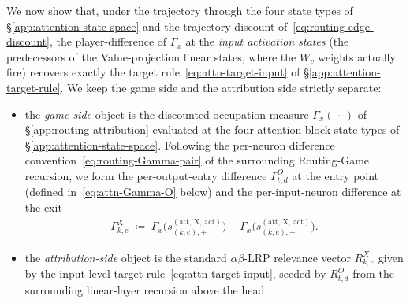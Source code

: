 \documentclass[twoside]{article}
\newcommand{\1}{\mathbf{1}}
\begin{document}
We now show that, under the trajectory through the four state types of
\S\ref{app:attention-state-space} and the trajectory discount of~\eqref{eq:routing-edge-discount},
the player-difference of $\Gamma_x$ at the \emph{input activation states} (the predecessors of the
Value-projection linear states, where the $W_v$ weights actually fire) recovers exactly the target
rule~\eqref{eq:attn-target-input} of \S\ref{app:attention-target-rule}. We keep the game side and
the attribution side strictly separate:
\begin{itemize}
    \item the \emph{game-side} object is the discounted occupation measure $\Gamma_x(\,\cdot\,)$ of
        \S\ref{app:routing-attribution} evaluated at the four attention-block state types of
        \S\ref{app:attention-state-space}. Following the per-neuron difference
        convention~\eqref{eq:routing-Gamma-pair} of the surrounding Routing-Game recursion, we form the
        per-output-entry difference $\Gamma^{O}_{t,d}$ at the entry point (defined
        in~\eqref{eq:attn-Gamma-O} below) and the per-input-neuron difference at the exit
        \begin{align}\label{eq:attn-Gamma-X}
            \Gamma^{X}_{k,e} \;\coloneqq\;
            \Gamma_x\!\bigl(s_{(k,e),+}^{(\mathrm{att},\,\mathrm{X},\,\mathrm{act})}\bigr) -
            \Gamma_x\!\bigl(s_{(k,e),-}^{(\mathrm{att},\,\mathrm{X},\,\mathrm{act})}\bigr).
        \end{align}
    \item the \emph{attribution-side} object is the standard $\alpha\beta$-\ac{LRP} relevance vector
        $R^{X}_{k,e}$ given by the input-level target rule~\eqref{eq:attn-target-input}, seeded by
        $R^{O}_{t,d}$ from the surrounding linear-layer recursion above the head.
\end{itemize}
\end{document}
